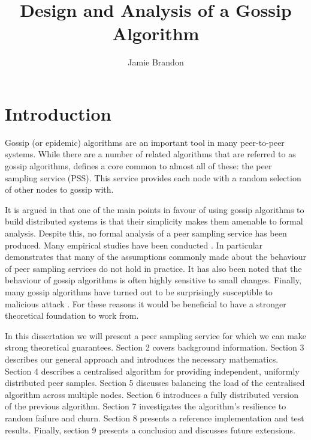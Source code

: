\documentclass[a4paper,10pt]{article}
\begin{document}
\title{Design and Analysis of a Gossip Algorithm}
\author{Jamie Brandon}
\date{}

\maketitle

\clearpage

\section{Introduction}

Gossip (or epidemic) algorithms are an important tool in many peer-to-peer systems. While there are a number of related algorithms that are referred to as gossip algorithms, \cite{pss} defines a core common to almost all of these: the peer sampling service (PSS). This service provides each node with a random selection of other nodes to gossip with. 

It is argued in \cite{formal_analysis} that one of the main points in favour of using gossip algorithms to build distributed systems is that their simplicity makes them amenable to formal analysis. Despite this, no formal analysis of a peer sampling service has been produced. Many empirical studies have been conducted \cite{pss, formal_analysis}. In particular \cite{pss} demonstrates that many of the assumptions commonly made about the behaviour of peer sampling services do not hold in practice. It has also been noted \cite{pss, arrg, how_robust, emergent_gossip} that the behaviour of gossip algorithms is often highly sensitive to small changes. Finally, many gossip algorithms have turned out to be surprisingly susceptible to malicious attack \cite{poison, poison_buddycast, poison_mosquito, poison_antimosquito}. For these reasons it would be beneficial to have a stronger theoretical foundation to work from.

In this dissertation we will present a peer sampling service for which we can make strong theoretical guarantees. Section 2 covers background information. Section 3 describes our general approach and introduces the necessary mathematics. Section 4 describes a centralised algorithm for providing independent, uniformly distributed peer samples. Section 5 discusses balancing the load of the centralised algorithm across multiple nodes. Section 6 introduces a fully distributed version of the previous algorithm. Section 7 investigates the algorithm's resilience to random failure and churn. Section 8 presents a reference implementation and test results. Finally, section 9 presents a conclusion and discusses future extensions.
\end{document}
